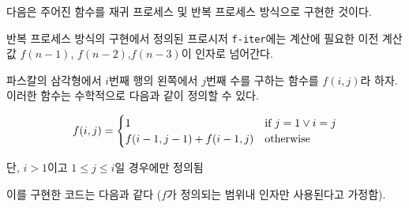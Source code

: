 
다음은 주어진 함수를 재귀 프로세스 및 반복 프로세스 방식으로 구현한 것이다.


반복 프로세스 방식의 구현에서 정의된 프로시저 \texttt{f-iter}에는 계산에
필요한 이전 계산값 $f(n-1)$, $f(n-2)$,$f(n-3)$이 인자로 넘어간다.


파스칼의 삼각형에서 $i$번째 행의 왼쪽에서 $j$번째 수를 구하는 함수를 $f(i,j)$라
하자. 이러한 함수는 수학적으로 다음과 같이 정의할 수 있다.

\begin{equation}\notag
  f(i,j) =
  \begin{cases}
    1                    & \text{if } j=1 \vee i=j\\
    f(i-1,j-1) + f(i-1,j) & \text{otherwise}
  \end{cases}
\end{equation}
\begin{center}
  \qquad\qquad\qquad 단, $i>1$이고 $1\le j \le i$일 경우에만 정의됨
\end{center}

이를  구현한 코드는 다음과 같다 ($f$가 정의되는 범위내 인자만
사용된다고 가정함).



